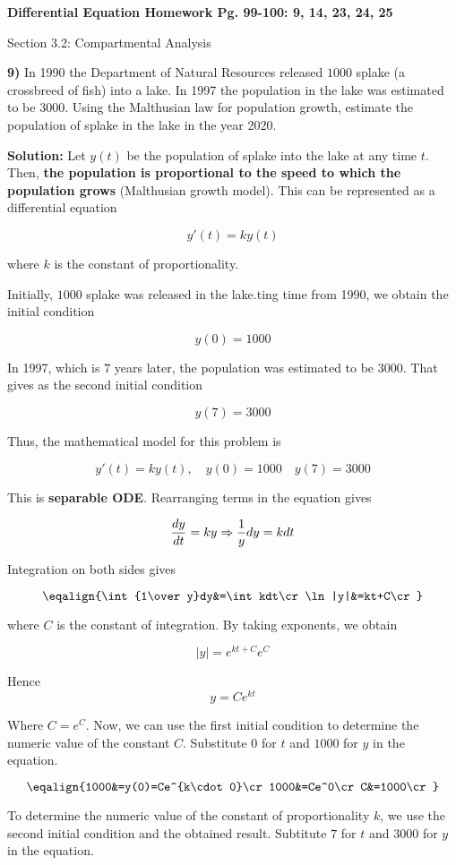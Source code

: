 \centerline{{\bf Differential Equation Homework Pg. 99-100: 9, 14, 23, 24, 25}}

\vskip 1mm
\centerline{Section 3.2: Compartmental Analysis}

\vskip 1cm
{\bf 9)} In 1990 the Department of Natural Resources released $1000$ splake (a crossbreed of fish) into a lake. In 1997 the population in the lake was estimated to be $3000$. Using the Malthusian law for population growth, estimate the population of splake in the lake in the year 2020.

\vskip 1cm
{\bf Solution:} Let $y(t)$ be the population of splake into the lake at any time $t$. Then, {\bf the population is proportional to the speed to which the population grows} (Malthusian growth model). This can be represented as a differential equation

$$y'(t)=ky(t)$$

where $k$ is the constant of proportionality.

\vskip 1mm
Initially, $1000$ splake was released in the lake.ting time from 1990, we obtain the initial condition

$$y(0)=1000$$

In 1997, which is $7$ years later, the population was estimated to be $3000$. That gives as the second initial condition

$$y(7)=3000$$

Thus, the mathematical model for this problem is

$$y'(t)=ky(t),\quad y(0)=1000\quad y(7)=3000$$

This is {\bf separable ODE}. Rearranging terms in the equation gives

$${dy\over dt}=ky\Rightarrow {1\over y}dy=kdt$$

Integration on both sides gives

$$\eqalign{\int{1\over y}dy&=\int kdt\cr
	\ln|y|&=kt+C\cr}$$

where $C$ is the constant of integration. By taking exponents, we obtain

$$|y|=e^{kt+C}e^C$$

Hence
$$y=Ce^{kt}$$

Where $C=e^C$. Now, we can use the first initial condition to determine the numeric value of the constant $C$. Substitute $0$ for $t$ and $1000$ for $y$ in the equation.

$$\eqalign{1000&=y(0)=Ce^{k\cdot 0}\cr
	1000&=Ce^0\cr
	C&=1000\cr}$$

To determine the numeric value of the constant of proportionality $k$, we use the second initial condition and the obtained result. Subtitute $7$ for $t$ and $3000$ for $y$ in the equation.

